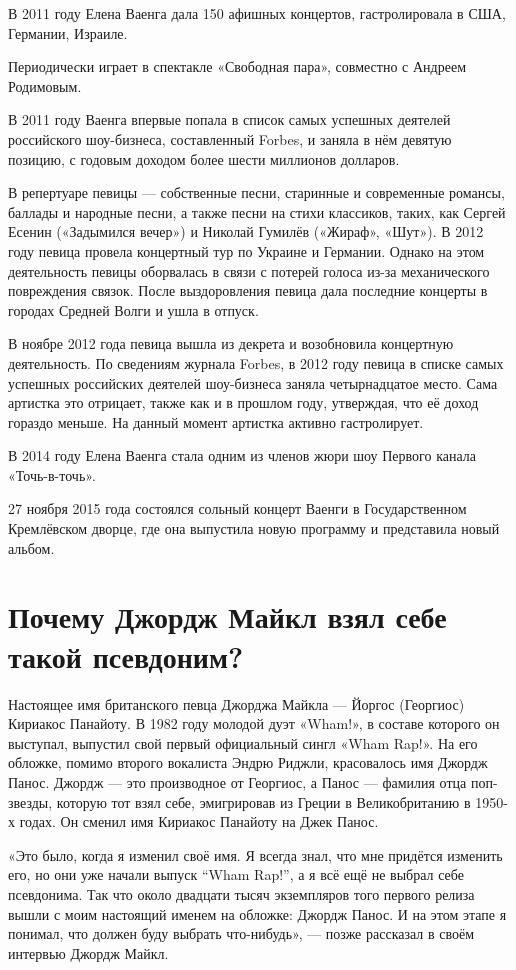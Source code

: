В 2011 году Елена Ваенга дала 150 афишных концертов, гастролировала в США, Германии, Израиле.

Периодически играет в спектакле «Свободная пара», совместно с Андреем Родимовым.

В 2011 году Ваенга впервые попала в список самых успешных деятелей российского шоу-бизнеса, составленный Forbes, и заняла в нём девятую позицию, с годовым доходом более шести миллионов долларов.

В репертуаре певицы --- собственные песни, старинные и современные романсы, баллады и народные песни, а также песни на стихи классиков, таких, как Сергей Есенин («Задымился вечер») и Николай Гумилёв («Жираф», «Шут»). В 2012 году певица провела концертный тур по Украине и Германии. Однако на этом деятельность певицы оборвалась в связи с потерей голоса из-за механического повреждения связок. После выздоровления певица дала последние концерты в городах Средней Волги и ушла в отпуск.

В ноябре 2012 года певица вышла из декрета и возобновила концертную деятельность. По сведениям журнала Forbes, в 2012 году певица в списке самых успешных российских деятелей шоу-бизнеса заняла четырнадцатое место. Сама артистка это отрицает, также как и в прошлом году, утверждая, что её доход гораздо меньше. На данный момент артистка активно гастролирует.

В 2014 году Елена Ваенга стала одним из членов жюри шоу Первого канала «Точь-в-точь».

27 ноября 2015 года состоялся сольный концерт Ваенги в Государственном Кремлёвском дворце, где она выпустила новую программу и представила новый альбом.


\section{Почему Джордж Майкл взял себе такой псевдоним?}

Настоящее имя британского певца Джорджа Майкла --- Йоргос (Георгиос) Кириакос Панайоту. В 1982 году молодой дуэт «Wham!», в составе которого он выступал, выпустил свой первый официальный сингл «Wham Rap!». На его обложке, помимо второго вокалиста Эндрю Риджли, красовалось имя Джордж Панос. Джордж --- это производное от Георгиос, а Панос --- фамилия отца поп-звезды, которую тот взял себе, эмигрировав из Греции в Великобританию в 1950-х годах. Он сменил имя Кириакос Панайоту на Джек Панос.

«Это было, когда я изменил своё имя. Я всегда знал, что мне придётся изменить его, но они уже начали выпуск ``Wham Rap!'', а я всё ещё не выбрал себе псевдонима. Так что около двадцати тысяч экземпляров того первого релиза вышли с моим настоящий именем на обложке: Джордж Панос. И на этом этапе я понимал, что должен буду выбрать что-нибудь», --- позже рассказал в своём интервью Джордж Майкл.

